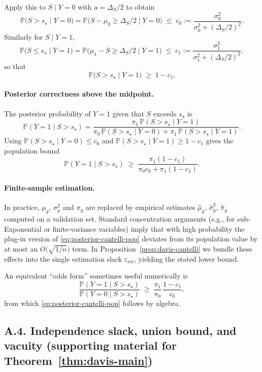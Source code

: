 \documentclass[11pt]{article}
\begin{document}
Apply this to $S\mid Y=0$ with $a=\Delta_S/2$ to obtain
\[
\mathbb{P}\bigl(S > s_\star \mid Y=0\bigr)
=
\mathbb{P}\bigl(S-\mu_0 \ge \Delta_S/2 \mid Y=0\bigr)
\;\le\;
c_0
:=
\frac{\sigma_0^2}{\sigma_0^2 + (\Delta_S/2)^2}.
\]
Similarly for $S\mid Y=1$,
\[
\mathbb{P}\bigl(S \le s_\star \mid Y=1\bigr)
=
\mathbb{P}\bigl(\mu_1 - S \ge \Delta_S/2 \mid Y=1\bigr)
\;\le\;
c_1
:=
\frac{\sigma_1^2}{\sigma_1^2 + (\Delta_S/2)^2},
\]
so that
\[
\mathbb{P}\bigl(S > s_\star \mid Y=1\bigr)
\;\ge\;
1-c_1.
\]

\paragraph{Posterior correctness above the midpoint.}
The posterior probability of $Y=1$ given that $S$ exceeds $s_\star$ is
\[
\mathbb{P}(Y=1 \mid S> s_\star)
=
\frac{\pi_1\,\mathbb{P}(S> s_\star\mid Y=1)}
     {\pi_0\,\mathbb{P}(S> s_\star\mid Y=0) + \pi_1\,\mathbb{P}(S> s_\star\mid Y=1)}.
\]
Using $\mathbb{P}(S> s_\star\mid Y=0)\le c_0$ and
$\mathbb{P}(S> s_\star\mid Y=1)\ge 1-c_1$ gives the population bound
\begin{equation}
\mathbb{P}(Y=1 \mid S> s_\star)
\;\ge\;
\frac{\pi_1(1-c_1)}{\pi_0 c_0 + \pi_1(1-c_1)}.
\label{eq:posterior-cantelli-pop}
\end{equation}

\paragraph{Finite-sample estimation.}
In practice, $\mu_y$, $\sigma_y^2$ and $\pi_y$ are replaced by empirical estimates
$\hat\mu_y$, $\hat\sigma_y^2$, $\hat\pi_y$ computed on a validation set. Standard concentration
arguments (e.g., for sub-Exponential or finite-variance variables) imply that with high probability
the plug-in version of \eqref{eq:posterior-cantelli-pop} deviates from its population value by at
most an $O\!\big(\sqrt{1/n}\big)$ term. In Proposition~\ref{prop:davis-cantelli} we bundle these
effects into the single estimation slack $\varepsilon_{\mathrm{est}}$, yielding the stated lower bound.

An equivalent ``odds form'' sometimes useful numerically is
\[
\frac{\mathbb{P}(Y=1\mid S> s_\star)}{\mathbb{P}(Y=0\mid S> s_\star)}
\;\ge\;
\frac{\pi_1}{\pi_0}\,
\frac{1-c_1}{c_0},
\]
from which \eqref{eq:posterior-cantelli-pop} follows by algebra.

\medskip

\subsection*{A.4. Independence slack, union bound, and vacuity (supporting material for Theorem~\ref{thm:davis-main})}
\end{document}
